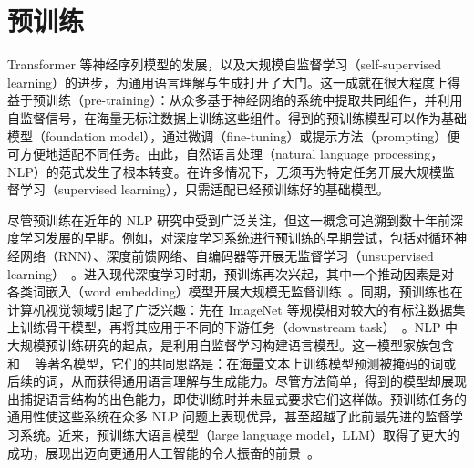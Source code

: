 
%




\chapter{预训练}

\thispagestyle{chapterurl} %

\noindent Transformer 等神经序列模型的发展，以及大规模自监督学习（self-supervised learning）的进步，为通用语言理解与生成打开了大门。这一成就在很大程度上得益于预训练（pre-training）：从众多基于神经网络的系统中提取共同组件，并利用自监督信号，在海量无标注数据上训练这些组件。得到的预训练模型可以作为基础模型（foundation model），通过微调（fine-tuning）或提示方法（prompting）便可方便地适配不同任务。由此，自然语言处理（natural language processing，NLP）的范式发生了根本转变。在许多情况下，无须再为特定任务开展大规模监督学习（supervised learning），只需适配已经预训练好的基础模型。

尽管预训练在近年的 NLP 研究中受到广泛关注，但这一概念可追溯到数十年前深度学习发展的早期。例如，对深度学习系统进行预训练的早期尝试，包括对循环神经网络（RNN）、深度前馈网络、自编码器等开展无监督学习（unsupervised learning）~\cite{schmidhuber-etal:2015deep}。进入现代深度学习时期，预训练再次兴起，其中一个推动因素是对各类词嵌入（word embedding）模型开展大规模无监督训练~\cite{Mikolov-et-al:2013distributed,pennington2014glove}。同期，预训练也在计算机视觉领域引起了广泛兴趣：先在 ImageNet 等规模相对较大的有标注数据集上训练骨干模型，再将其应用于不同的下游任务（downstream task）~\cite{he-etal:2019rethinking,zoph-etal:2020rethinking}。NLP 中大规模预训练研究的起点，是利用自监督学习构建语言模型。这一模型家族包含 ~\cite{devlin-etal:2019bert} 和 ~\cite{brown-etal:2020language} 等著名模型，它们的共同思路是：在海量文本上训练模型预测被掩码的词或后续的词，从而获得通用语言理解与生成能力。尽管方法简单，得到的模型却展现出捕捉语言结构的出色能力，即使训练时并未显式要求它们这样做。预训练任务的通用性使这些系统在众多 NLP 问题上表现优异，甚至超越了此前最先进的监督学习系统。近来，预训练大语言模型（large language model，LLM）取得了更大的成功，展现出迈向更通用人工智能的令人振奋的前景~\cite{bubeck-etal:2023sparks}。

